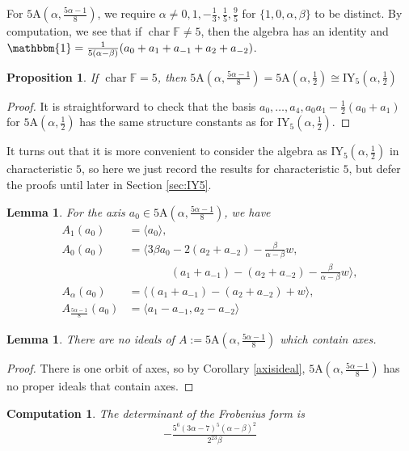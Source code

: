\documentclass[11pt, a4paper]{article}
\theoremstyle{plain}
\newtheorem{lemma}[theorem]{Lemma}
\newtheorem{proposition}[theorem]{Proposition}
\newtheorem{computation}[theorem]{Computation}
\theoremstyle{definition}
\newcommand\al{\alpha}
\newcommand\bt{\beta}
\newcommand\la{\langle}
\newcommand\ra{\rangle}
\DeclareMathOperator{\ch}{char}
\newcommand\FF{\mathbb{F}}
\newcommand{\A}{\mathrm{A}}
\newcommand{\IY}{\mathrm{IY}}
\newcommand{\0}{\overline{0}}
\newcommand{\2}{\overline{2}}
\newcommand{\1}{\mathbbm{1}}
\begin{document}
For $5\A(\al, \tfrac{5\al-1}{8})$, we require $\al  \neq 0, 1, -\tfrac{1}{3}, \tfrac{1}{5}, \tfrac{9}{5}$ for $\{1,0,\al,\bt\}$ to be distinct.  By computation, we see that  if $\ch \FF \neq 5$, then the algebra has an identity and $ \1 = \tfrac{1}{5(\al-\bt)}(a_0+a_1+a_{-1}+a_2+a_{-2})$.

\begin{proposition}\label{5AIY5iso}\textup{\cite{highwater5}}
If $\ch \FF = 5$, then $5\A(\al, \frac{5\al-1}{8}) = 5\A(\al, \frac{1}{2}) \cong \IY_5(\al, \frac{1}{2})$
\end{proposition}
\begin{proof}
It is straightforward to check that the basis $a_0, \dots, a_4, a_0a_1 - \frac{1}{2}(a_0+a_1)$ for $5\A(\al, \frac{1}{2})$ has the same structure constants as for $\IY_5(\al, \frac{1}{2})$.
\end{proof}

It turns out that it is more convenient to consider the algebra as $\IY_5(\al, \frac{1}{2})$ in characteristic $5$, so here we just record the results for characteristic $5$, but defer the proofs until later in Section \ref{sec:IY5}.

\begin{lemma}
	For the axis $a_0 \in 5\A(\al, \tfrac{5\al-1}{8})$, we have
	\begin{align*}
		A_1(a_0) &= \la a_0 \ra, \\	
		A_0(a_0) &= \la 3\bt a_0 - 2(a_2+a_{-2}) -\tfrac{\bt}{\al-\bt}w, \\
		& \phantom{{}= \la{}} \qquad (a_1+a_{-1}) - (a_2+a_{-2}) -\tfrac{\bt}{\al-\bt}w \ra, \\
		A_{\al}(a_0) &= \la (a_1+a_{-1}) - (a_2+a_{-2}) +w\ra, \\
		A_{\tfrac{5\al-1}{8}}(a_0) &= \la a_1 - a_{-1}, a_2 -a_{-2} \ra 
	\end{align*}
\end{lemma}

\begin{lemma}
	There are no ideals of $A := 5\A(\al, \tfrac{5\al-1}{8})$ which contain axes.
\end{lemma}
\begin{proof}
There is one orbit of axes, so by Corollary \ref{axisideal}, $5\A(\al, \frac{5\al-1}{8})$ has no proper ideals that contain axes.
\end{proof}

\begin{computation}
	The determinant of the Frobenius form is
	\[
	-\tfrac{5^6 (3\al - 7)^5 (\al -\bt)^2}{2^{23}\bt}
	\]
\end{computation}
\end{document}
